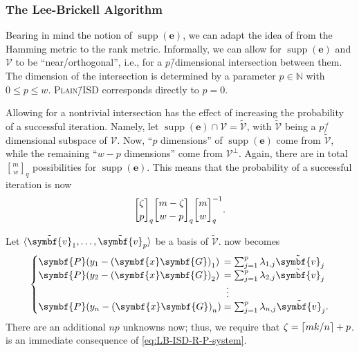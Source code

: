 \documentclass[version=last, paper=A4, parskip=half, oneside]{scrbook}
\theoremstyle{plain}
\theoremstyle{definition}
\theoremstyle{remark}
\renewcommand*{\vec}{\symbf}
\newcommand*{\mat}{\symbf}
\DeclareMathOperator{\supp}{supp}
\DeclarePairedDelimiter{\basis}{\langle}{\rangle}
\newcommand*{\NN}{\ensuremath{\mathbb{N}}}
\DeclarePairedDelimiter{\ceil}{\lceil}{\rceil}
\DeclareRobustCommand{\qbinom}{\genfrac[]{0pt}{}}
\newcommand*{\PISD}{\textsc{Plain}\=/ISD}
\begin{document}
\subsubsection{The Lee\--Brickell Algorithm}

Bearing in mind the notion of \(\supp(\vec{e})\), we can adapt the idea of
\textcite{LB88} from the Hamming metric to the rank metric.  Informally, we can
allow for \(\supp(\vec{e})\) and \(\mathcal{V}\) to be
\enquote{near\-/orthogonal}, i.e., for a \(p\)\=/dimensional intersection
between them.  The dimension of the intersection is determined by a parameter
\(p \in \NN\) with \(0 \le p \le w\).  \PISD{} corresponds directly to
\(p = 0\).

Allowing for a nontrivial intersection has the effect of increasing the
probability of a successful iteration.  Namely, let
\(\supp(\vec{e}) \cap \mathcal{V} = \tilde{\mathcal{V}}\), with
\(\tilde{\mathcal{V}}\) being a \(p\)\=/dimensional subspace of
\(\mathcal{V}\).  Now, \enquote{\(p\) dimensions} of \(\supp(\vec{e})\) come
from \(\tilde{\mathcal{V}}\), while the remaining \enquote{\(w - p\)
  dimensions} come from \(\mathcal{V}^{\perp}\).  Again, there are in total
\(\qbinom{m}{w}_q\) possibilities for \(\supp(\vec{e})\).  This means that the
probability of a successful iteration is now
\begin{equation}\label{eq:LB-ISD-R-P-probability}
  \qbinom{\zeta}{p}_q \qbinom{m - \zeta}{w - p}_q \qbinom{m}{w}_q^{-1}\text.
\end{equation}

Let \(\basis{\tilde{\vec{v}}_1, \ldots, \tilde{\vec{v}}_p}\) be a basis of
\(\tilde{\mathcal{V}}\).   now becomes
\begin{equation}\label{eq:LB-ISD-R-P-system}
  \setlength{\arraycolsep}{0pt}
  \newcolumntype{B}{>{{}}c<{{}}}
  \left\{
    \begin{array}{l B l}
      \mat{P} (y_1 - {(\vec{x} \mat{G})}_1)
      & = &
            \sum_{j = 1}^p \lambda_{1, j} \tilde{\vec{v}}_j \\
      \mat{P} (y_2 - {(\vec{x} \mat{G})}_2)
      & = &
            \sum_{j = 1}^p \lambda_{2, j} \tilde{\vec{v}}_j \\
      & \vdots &                                          \\
      \mat{P} (y_n - {(\vec{x} \mat{G})}_n)
      & = &
            \sum_{j = 1}^p \lambda_{n, j} \tilde{\vec{v}}_j\text.
    \end{array}
  \right.
\end{equation}
There are an additional \(n p\) unknowns now; thus, we require that
\(\zeta = \ceil{m k / {n}} + p\).   is an immediate
consequence of \cref{eq:LB-ISD-R-P-system}.
\end{document}
